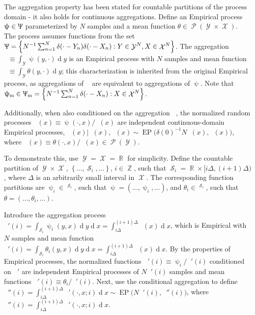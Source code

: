 \documentclass[12pt]{report}
\DeclareMathOperator{\drm}{\mathrm{d}}
\DeclareMathOperator{\Xcal}{\mathcal{X}}
\DeclareMathOperator{\Ycal}{\mathcal{Y}}
\DeclareMathOperator{\Scal}{\mathcal{S}}
\DeclareMathOperator{\Pcal}{\mathcal{P}}
\DeclareMathOperator{\Rbb}{\mathbb{R}}
\DeclareMathOperator{\Rbbgeq}{\mathbb{R}_{\geq 0}}
\DeclareMathOperator{\Zbb}{\mathbb{Z}}
\DeclareMathOperator{\EP}{\mathrm{EP}}
\DeclareMathOperator{\thetam}{\theta_\text{m}}
\DeclareMathOperator{\thetac}{\theta_\text{c}}
\DeclareMathOperator{\upthetac}{\uptheta_\text{c}}
\DeclareMathOperator{\uppsim}{\uppsi_\text{m}}
\DeclareMathOperator{\Uppsim}{\Uppsi_\text{m}}
\DeclareMathOperator{\uppsic}{\uppsi_\text{c}}
\begin{document}
The aggregation property has been stated for countable partitions of the process domain - it also holds for continuous aggregations. Define an Empirical process $\uppsi \in \Uppsi$ parameterized by $N$ samples and a mean function $\theta \in \Pcal(\Ycal \times \Xcal)$. The process assumes functions from the set $\Uppsi = \left\{ N^{-1} \sum_{n=1}^N \delta(\cdot - Y_n) \delta(\cdot - X_n) : Y \in \Ycal^N, X \in \Xcal^N \right\}$. The aggregation $\uppsim \equiv \int_{\Ycal} \uppsi(y,\cdot) {\drm}y$ is an Empirical process with $N$ samples and mean function $\thetam \equiv \int_{\Ycal} \theta(y,\cdot) {\drm}y$; this characterization is inherited from the original Empirical process, as aggregations of $\uppsim$ are equivalent to aggregations of $\uppsi$. Note that $\uppsim \in \Uppsim = \left\{ N^{-1} \sum_{n=1}^N \delta(\cdot - X_n) : X \in \Xcal^N \right\}$.

Additionally, when also conditioned on the aggregation $\uppsim$, the normalized random processes $\uppsic(x) \equiv \uppsi(\cdot,x) / \uppsim(x)$ are independent continuous-domain Empirical processes, $\uppsic(x) | \uppsim(x), \upthetac(x) \sim \EP\big(\delta(0)^{-1} N \uppsim(x), \upthetac(x)\big)$, where $\thetac(x) \equiv \theta(\cdot,x) / \thetam(x) \in \Pcal(\Ycal)$.



To demonstrate this, use $\Ycal = \Xcal = \Rbb$ for simplicity. Define the countable partition of $\Ycal \times \Xcal$, $\left\{ \ldots,\Scal_i,\ldots \right\}$, $i \in \Zbb$, such that $\Scal_i = \Rbb \times \big [i\Delta,(i+1)\Delta \big)$, where $\Delta$ is an arbitrarily small interval in $\Xcal$. The corresponding function partitions are $\uppsi_i \in \Rbbgeq^{\Scal_i}$, such that $\uppsi = \left( \ldots,\uppsi_i,\ldots \right)$, and $\theta_i \in \Rbbgeq^{\Scal_i}$, such that $\theta = \left( \ldots,\theta_i,\ldots \right)$.

Introduce the aggregation process $\uppsim'(i) = \int_{\Scal_i} \uppsi_i(y,x) {\drm}y {\drm}x = \int_{i\Delta}^{(i+1)\Delta} \uppsim(x) {\drm}x$, which is Empirical with $N$ samples and mean function $\thetam'(i) = \int_{\Scal_i} \theta_i(y,x) {\drm}y {\drm}x = \int_{i\Delta}^{(i+1)\Delta} \thetam(x) {\drm}x$. By the properties of Empirical processes, the normalized functions $\uppsic'(i) \equiv \uppsi_i / \uppsim'(i)$ conditioned on $\uppsim'$ are independent Empirical processes of $N \uppsim'(i)$ samples and mean functions $\thetac'(i) \equiv \theta_i / \thetam'(i)$. Next, use the conditional aggregation to define $\uppsic''(i) = \int_{i\Delta}^{(i+1)\Delta} \uppsic'(\cdot,x;i) {\drm}x \sim \EP\big( N \uppsim'(i), \thetac''(i) \big)$, where $\thetac''(i) = \int_{i\Delta}^{(i+1)\Delta} \thetac'(\cdot,x;i) {\drm}x$. 
\end{document}
